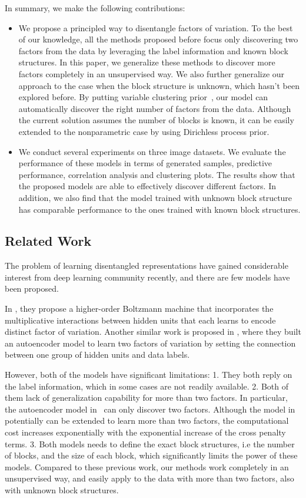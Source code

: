In summary, we make the following contributions:
\begin{itemize}
\item We propose a principled way to disentangle factors of variation. To the best of our knowledge, all the methods proposed before focus only discovering two factors from the data by leveraging the label information and known block structures. In this paper, we generalize these methods to discover more factors completely in an unsupervised way. We also further generalize our approach to the case when the block structure is unknown, which hasn't been explored before. By putting variable clustering prior~\cite{palla2012nonparametric}, our model can automatically discover the right number of factors from the data. Although the current solution assumes the number of blocks is known, it can be easily extended to the nonparametric case by using Dirichless process prior.
\item We conduct several experiments on three image datasets. We evaluate the performance of these models in terms of generated samples, predictive performance, correlation analysis and clustering plots. The results show that the proposed models are able to effectively discover different factors. In addition, we also find that the model trained with unknown block structure has comparable performance to the ones trained with known block structures.
\end{itemize}


\subsection{Related Work}
The problem of learning disentangled representations have gained considerable interest from deep learning community recently, and there are few models have been proposed.

In \cite{reed2014learning}, they propose a higher-order Boltzmann machine that incorporates the multiplicative interactions between hidden units that each learns to encode distinct factor of variation. Another similar work is proposed in \cite{cheung2014discovering}, where they built an autoencoder model to learn two factors of variation by setting the connection between one group of hidden units and data labels.

However, both of the models have significant limitations: 1. They both reply on the label information, which in some cases are not readily available. 2. Both of them lack of generalization capability for more than two factors. In particular, the autoencoder model in~\cite{cheung2014discovering} can only discover two factors. Although the model in \cite{reed2014learning} potentially can be extended to learn more than two factors, the computational cost increases exponentially with the exponential increase of the cross penalty terms. 3. Both models needs to define the exact block structures, i.e the number of blocks, and the size of each block, which significantly limits the power of these models. Compared to these previous work, our methods work completely in an unsupervised way, and easily apply to the data with more than two factors, also with unknown block structures.

